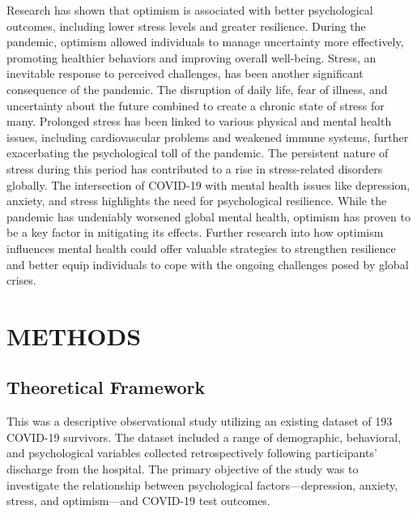 \documentclass[a4paper]{article}
\begin{document}
Research has shown that optimism is associated with better psychological outcomes, including lower stress levels and greater resilience. During the pandemic,
optimism allowed individuals to manage uncertainty more effectively, promoting healthier behaviors and improving overall well-being.
\vspace{0.5em}\newline
Stress, an inevitable response to perceived challenges, has been another significant consequence of the pandemic.
The disruption of daily life, fear of illness, and uncertainty about the future combined to create a chronic state of stress for many. Prolonged stress has been linked to various physical and mental health issues,
including cardiovascular problems and weakened immune systems, further exacerbating the psychological toll of the pandemic.
The persistent nature of stress during this period has contributed to a rise in stress-related disorders globally.
\vspace{0.5em}\newline
The intersection of COVID-19 with mental health issues like depression, anxiety, and stress highlights the need for psychological resilience.
While the pandemic has undeniably worsened global mental health, optimism has proven to be a key factor in mitigating its effects. Further research into 
how optimism influences mental health could offer valuable strategies to strengthen resilience and better equip individuals to cope with the ongoing challenges posed by global crises.


\vspace{2em}
\section{METHODS}
\subsection{Theoretical Framework}
\vspace{0.5em}
This was a descriptive observational study utilizing an existing dataset of 193 COVID-19 survivors.
The dataset included a range of demographic, behavioral, and psychological variables collected retrospectively following participants' discharge from the hospital.
The primary objective of the study was to investigate the relationship between psychological factors—depression, anxiety, stress, and optimism—and COVID-19 test outcomes.

\vspace{1em}
\end{document}
